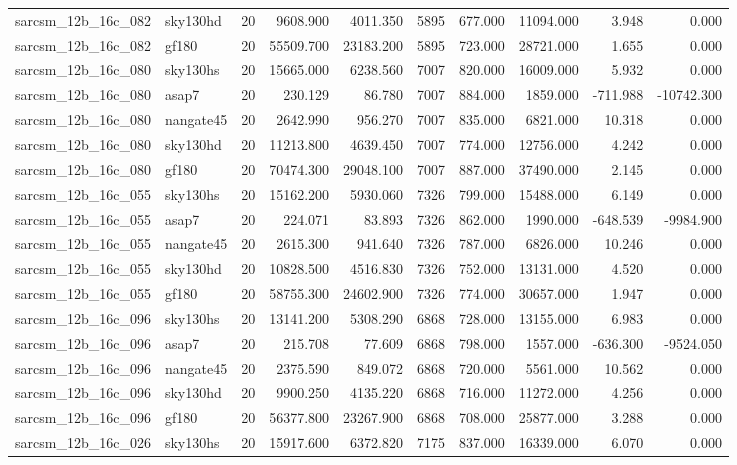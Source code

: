 \documentclass{article}
\begin{document}
\begin{longtable}{llrrrrrrrr}
sarcsm\_12b\_16c\_082 & sky130hd & 20 & 9608.900 & 4011.350 & 5895 & 677.000 & 11094.000 & 3.948 & 0.000 \\
sarcsm\_12b\_16c\_082 & gf180 & 20 & 55509.700 & 23183.200 & 5895 & 723.000 & 28721.000 & 1.655 & 0.000 \\
sarcsm\_12b\_16c\_080 & sky130hs & 20 & 15665.000 & 6238.560 & 7007 & 820.000 & 16009.000 & 5.932 & 0.000 \\
sarcsm\_12b\_16c\_080 & asap7 & 20 & 230.129 & 86.780 & 7007 & 884.000 & 1859.000 & -711.988 & -10742.300 \\
sarcsm\_12b\_16c\_080 & nangate45 & 20 & 2642.990 & 956.270 & 7007 & 835.000 & 6821.000 & 10.318 & 0.000 \\
sarcsm\_12b\_16c\_080 & sky130hd & 20 & 11213.800 & 4639.450 & 7007 & 774.000 & 12756.000 & 4.242 & 0.000 \\
sarcsm\_12b\_16c\_080 & gf180 & 20 & 70474.300 & 29048.100 & 7007 & 887.000 & 37490.000 & 2.145 & 0.000 \\
sarcsm\_12b\_16c\_055 & sky130hs & 20 & 15162.200 & 5930.060 & 7326 & 799.000 & 15488.000 & 6.149 & 0.000 \\
sarcsm\_12b\_16c\_055 & asap7 & 20 & 224.071 & 83.893 & 7326 & 862.000 & 1990.000 & -648.539 & -9984.900 \\
sarcsm\_12b\_16c\_055 & nangate45 & 20 & 2615.300 & 941.640 & 7326 & 787.000 & 6826.000 & 10.246 & 0.000 \\
sarcsm\_12b\_16c\_055 & sky130hd & 20 & 10828.500 & 4516.830 & 7326 & 752.000 & 13131.000 & 4.520 & 0.000 \\
sarcsm\_12b\_16c\_055 & gf180 & 20 & 58755.300 & 24602.900 & 7326 & 774.000 & 30657.000 & 1.947 & 0.000 \\
sarcsm\_12b\_16c\_096 & sky130hs & 20 & 13141.200 & 5308.290 & 6868 & 728.000 & 13155.000 & 6.983 & 0.000 \\
sarcsm\_12b\_16c\_096 & asap7 & 20 & 215.708 & 77.609 & 6868 & 798.000 & 1557.000 & -636.300 & -9524.050 \\
sarcsm\_12b\_16c\_096 & nangate45 & 20 & 2375.590 & 849.072 & 6868 & 720.000 & 5561.000 & 10.562 & 0.000 \\
sarcsm\_12b\_16c\_096 & sky130hd & 20 & 9900.250 & 4135.220 & 6868 & 716.000 & 11272.000 & 4.256 & 0.000 \\
sarcsm\_12b\_16c\_096 & gf180 & 20 & 56377.800 & 23267.900 & 6868 & 708.000 & 25877.000 & 3.288 & 0.000 \\
sarcsm\_12b\_16c\_026 & sky130hs & 20 & 15917.600 & 6372.820 & 7175 & 837.000 & 16339.000 & 6.070 & 0.000 \\

\end{longtable}
\end{document}
